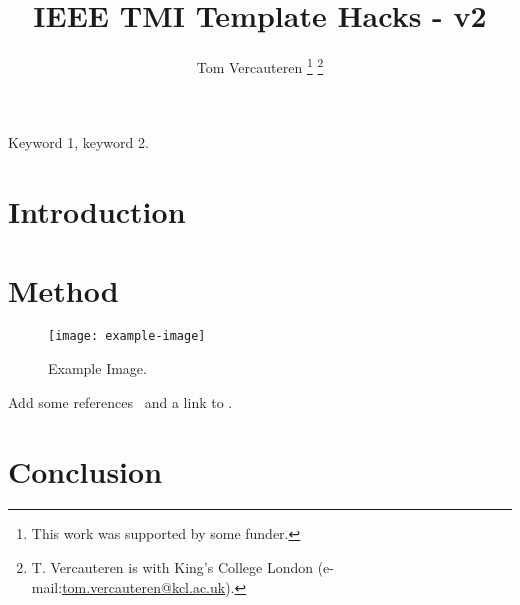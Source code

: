 \documentclass{ieeetmimod}
\begin{document}

\title{IEEE TMI Template Hacks - v2}
\author{Tom Vercauteren
\thanks{This work was supported by some funder.}%
\thanks{T. Vercauteren is with King's College London (e-mail:\href{mailto:tom.vercauteren@kcl.ac.uk}{tom.vercauteren@kcl.ac.uk}). }%
}


\maketitle

\begin{abstract}
\blindtext
\end{abstract}

\begin{IEEEkeywords}
Keyword 1, keyword 2.
\end{IEEEkeywords}

\section{Introduction}
\blindtext[2]

\section{Method}
\blindmathpaper

\begin{figure}[tbh!]
\centering
\texttt{[image: example-image]}
\caption{Example Image.\label{fig:example}}
\end{figure}

\blindtext
Add some references~\cite{article-full,inproceedings-full,phdthesis-full,Fidon:PAMI:2024,Bakas:arXiv:2018,Alabi:MedIA:2025} and a link to .

\section{Conclusion}
\blindtext[3]



 
\end{document}
